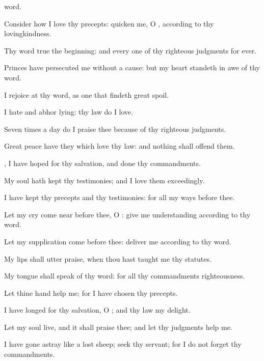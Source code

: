 {word.
\par }{\Q {}Consider how I
love thy
precepts:
quicken me, O
{}, according to thy
lovingkindness.
\par }{\Q {}Thy
word
{}
true
{} the
beginning: and every one of thy
righteous
judgments
{} for
ever.
\par }{
\par }{\Q {}Princes have
persecuted me without a
cause: but my
heart standeth in
awe of thy
word.
\par }{\Q {}I
rejoice at thy
word, as one that
findeth
great
spoil.
\par }{\Q {}I
hate and
abhor
lying:
{} thy
law do I
love.
\par }{\Q {}Seven
times a
day do I
praise thee because of thy
righteous
judgments.
\par }{\Q {}Great
peace have they which
love thy
law: and nothing shall
offend them.
\par }{\Q {}, I have
hoped for thy
salvation, and
done thy
commandments.
\par }{\BB \par }{\Q {}My
soul hath
kept thy
testimonies; and I
love them
exceedingly.
\par }{\Q {}I have
kept thy
precepts and thy
testimonies: for all my
ways
{} before thee.
\par }{\BB \par }{
\par }{\Q {}Let my
cry come
near
before thee, O
{}: give me
understanding according to thy
word.
\par }{\Q {}Let my
supplication
come
before thee:
deliver me according to thy
word.
\par }{\Q {}My
lips shall
utter
praise, when thou hast
taught me thy
statutes.
\par }{\Q {}My
tongue shall
speak of thy
word: for all thy
commandments
{}
righteousness.
\par }{\BB \par }{\Q {}Let thine
hand
help me; for I have
chosen thy
precepts.
\par }{\Q {}I have
longed for thy
salvation, O
{}; and thy
law
{} my
delight.
\par }{\Q {}Let my
soul
live, and it shall
praise thee; and let thy
judgments
help me.
\par }{\Q {}I have gone
astray like a
lost
sheep;
seek thy
servant; for I do not
forget thy
commandments.

}
